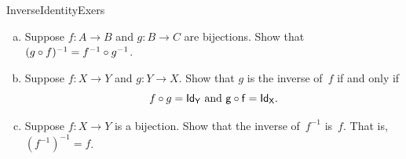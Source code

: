 \begin{exercise}{InverseIdentityExers}\ 
\begin{enumerate}[(a)]
\item \label{InverseIdentityExers-InvOfComp}
Suppose $f \colon A \to B$ and $g \colon B \to C$ are bijections. Show that $(g \circ f)^{-1} = f^{-1} \circ g^{-1}$.
\item \label{InverseIdentityExers-Comp=Id}
Suppose $f \colon X \to Y$ and $g \colon Y \to X$. Show that $g$ is the inverse of~$f$ if and only if
\[ f \circ g = \sf{Id}_Y \text{  and  }g \circ f = \sf{Id}_X .\]
\item \label{InverseIdentityExers-InvOfInv}
Suppose $f \colon X \to Y$ is a bijection. Show that the inverse of~$f^{-1}$ is~$f$. That is, $(f^{-1})^{-1} = f$.
\end{enumerate}
\end{exercise}



%
